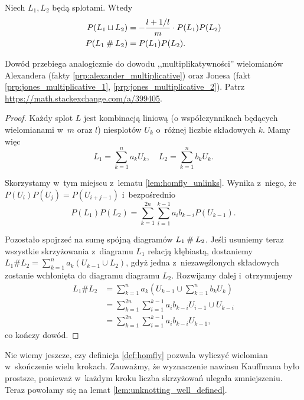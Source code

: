 \begin{proposition}
    Niech $L_1, L_2$ będą splotami.
    Wtedy
    \begin{align}
        P(L_1 \sqcup L_2) & = - \frac{l + 1/l}{m} \cdot P(L_1) P(L_2) \\
        P(L_1 \mathbin{\#} L_2) & = P(L_1) P(L_2).
    \end{align}
\end{proposition}

Dowód przebiega analogicznie do dowodu ,,multiplikatywności'' wielomianów Alexandera (fakty \ref{prp:alexander_multiplicative}) oraz Jonesa (fakt \ref{prp:jones_multiplicative_1}, \ref{prp:jones_multiplicative_2}).
Patrz \url{https://math.stackexchange.com/a/399405}.

\begin{proof}
    Każdy splot $L$ jest kombinacją liniową (o współczynnikach będących wielomianami w~$m$ oraz $l$) niesplotów $U_k$ o~różnej liczbie składowych $k$.
    Mamy więc
    \begin{equation}
        L_1 = \sum_{k=1}^n a_k U_k, \quad
        L_2 = \sum_{k=1}^n b_k U_k.
    \end{equation}

    Skorzystamy w~tym miejscu z~lematu \ref{lem:homfly_unlinks}.
    Wynika z~niego, że $P(U_i)P(U_j) = P(U_{i+j-1})$ i~bezpośrednio
    \begin{equation}
        P(L_1)P(L_2) = \sum_{k=1}^{2n} \sum_{i=1}^{k-1} a_i b_{k-i}P(U_{k-1}).
    \end{equation}

    Pozostało spojrzeć na sumę spójną diagramów  $L_1 \mathbin{\#} L_2$.
    Jeśli usuniemy teraz wszystkie skrzyżowania z~diagramu $L_1$ relacją kłębiastą, dostaniemy $L_1 \# L_2 = \sum_{k=1}^n a_k (U_{k-1} \cup L_2)$, gdyż jedna z~niezawęźlonych składowych zostanie wchłonięta do diagramu diagramu $L_2$.
    Rozwijamy dalej i~otrzymujemy
    \begin{align}
        L_1 \# L_2
        & = \sum_{k=1}^n a_k \left(U_{k-1} \cup \sum_{k=1}^n b_k U_k\right) \\
        & = \sum_{k=1}^{2n} \sum_{i=1}^{k-1} a_i b_{k-i} U_{i-1} \cup U_{k-i} \\
        & = \sum_{k=1}^{2n} \sum_{i=1}^{k-1} a_i b_{k-i} U_{k-1},
    \end{align}
    co kończy dowód.
\end{proof}

Nie wiemy jeszcze, czy definicja \ref{def:homfly} pozwala wyliczyć wielomian w~skończenie wielu krokach. %
Zauważmy, że wyznaczenie nawiasu Kauffmana było prostsze, ponieważ w~każdym kroku liczba skrzyżowań ulegała zmniejszeniu.
Teraz powołamy się na lemat \ref{lem:unknotting_well_defined}.

